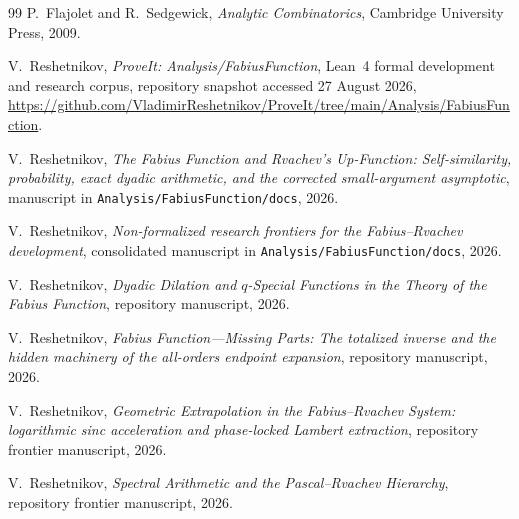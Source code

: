 \documentclass[11pt,oneside]{article}
\numberwithin{equation}{section}
\theoremstyle{definition}
\theoremstyle{remark}
\begin{document}
\begin{thebibliography}{99}
P.~Flajolet and R.~Sedgewick,
\newblock \emph{Analytic Combinatorics},
\newblock Cambridge University Press, 2009.

V.~Reshetnikov,
\newblock \emph{ProveIt: Analysis/FabiusFunction},
\newblock Lean~4 formal development and research corpus, repository snapshot accessed
27 August 2026,
\newblock \url{https://github.com/VladimirReshetnikov/ProveIt/tree/main/Analysis/FabiusFunction}.

V.~Reshetnikov,
\newblock \emph{The Fabius Function and Rvachev's Up-Function: Self-similarity, probability,
exact dyadic arithmetic, and the corrected small-argument asymptotic},
\newblock manuscript in \texttt{Analysis/FabiusFunction/docs}, 2026.

V.~Reshetnikov,
\newblock \emph{Non-formalized research frontiers for the Fabius--Rvachev development},
\newblock consolidated manuscript in \texttt{Analysis/FabiusFunction/docs}, 2026.

V.~Reshetnikov,
\newblock \emph{Dyadic Dilation and $q$-Special Functions in the Theory of the Fabius Function},
\newblock repository manuscript, 2026.

V.~Reshetnikov,
\newblock \emph{Fabius Function---Missing Parts: The totalized inverse and the hidden machinery of
the all-orders endpoint expansion},
\newblock repository manuscript, 2026.

V.~Reshetnikov,
\newblock \emph{Geometric Extrapolation in the Fabius--Rvachev System: logarithmic sinc
acceleration and phase-locked Lambert extraction},
\newblock repository frontier manuscript, 2026.

V.~Reshetnikov,
\newblock \emph{Spectral Arithmetic and the Pascal--Rvachev Hierarchy},
\newblock repository frontier manuscript, 2026.

\end{thebibliography}
\end{document}
